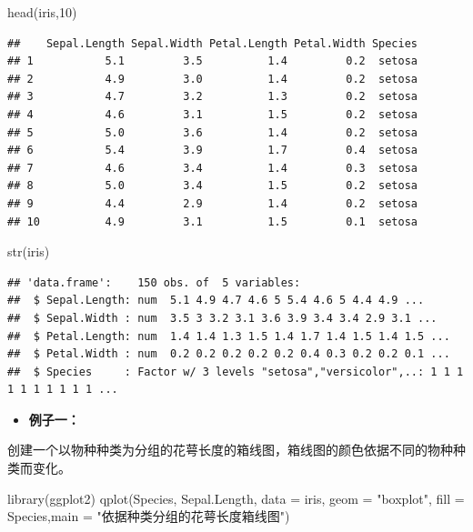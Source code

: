 \documentclass[
]{book}
\newenvironment{Shaded}{\begin{snugshade}}{\end{snugshade}}
\newcommand{\AttributeTok}[1]{\textcolor[rgb]{0.77,0.63,0.00}{#1}}
\newcommand{\DecValTok}[1]{\textcolor[rgb]{0.00,0.00,0.81}{#1}}
\newcommand{\FunctionTok}[1]{\textcolor[rgb]{0.00,0.00,0.00}{#1}}
\newcommand{\NormalTok}[1]{#1}
\newcommand{\StringTok}[1]{\textcolor[rgb]{0.31,0.60,0.02}{#1}}
\providecommand{\tightlist}{%
  \setlength{\itemsep}{0pt}\setlength{\parskip}{0pt}}
\begin{document}
\begin{Shaded}
\begin{Highlighting}[]
\FunctionTok{head}\NormalTok{(iris,}\DecValTok{10}\NormalTok{)}
\end{Highlighting}
\end{Shaded}

\begin{verbatim}
##    Sepal.Length Sepal.Width Petal.Length Petal.Width Species
## 1           5.1         3.5          1.4         0.2  setosa
## 2           4.9         3.0          1.4         0.2  setosa
## 3           4.7         3.2          1.3         0.2  setosa
## 4           4.6         3.1          1.5         0.2  setosa
## 5           5.0         3.6          1.4         0.2  setosa
## 6           5.4         3.9          1.7         0.4  setosa
## 7           4.6         3.4          1.4         0.3  setosa
## 8           5.0         3.4          1.5         0.2  setosa
## 9           4.4         2.9          1.4         0.2  setosa
## 10          4.9         3.1          1.5         0.1  setosa
\end{verbatim}

\begin{Shaded}
\begin{Highlighting}[]
\FunctionTok{str}\NormalTok{(iris)}
\end{Highlighting}
\end{Shaded}

\begin{verbatim}
## 'data.frame':    150 obs. of  5 variables:
##  $ Sepal.Length: num  5.1 4.9 4.7 4.6 5 5.4 4.6 5 4.4 4.9 ...
##  $ Sepal.Width : num  3.5 3 3.2 3.1 3.6 3.9 3.4 3.4 2.9 3.1 ...
##  $ Petal.Length: num  1.4 1.4 1.3 1.5 1.4 1.7 1.4 1.5 1.4 1.5 ...
##  $ Petal.Width : num  0.2 0.2 0.2 0.2 0.2 0.4 0.3 0.2 0.2 0.1 ...
##  $ Species     : Factor w/ 3 levels "setosa","versicolor",..: 1 1 1 1 1 1 1 1 1 1 ...
\end{verbatim}

\begin{itemize}
\tightlist
\item
  \textbf{例子一：}
\end{itemize}

创建一个以物种种类为分组的花萼长度的箱线图，箱线图的颜色依据不同的物种种类而变化。

\begin{Shaded}
\begin{Highlighting}[]
\FunctionTok{library}\NormalTok{(ggplot2)}
\FunctionTok{qplot}\NormalTok{(Species, Sepal.Length, }\AttributeTok{data =}\NormalTok{ iris, }\AttributeTok{geom =} \StringTok{"boxplot"}\NormalTok{,}
      \AttributeTok{fill =}\NormalTok{ Species,}\AttributeTok{main =} \StringTok{"依据种类分组的花萼长度箱线图"}\NormalTok{)}
\end{Highlighting}
\end{Shaded}
\end{document}
